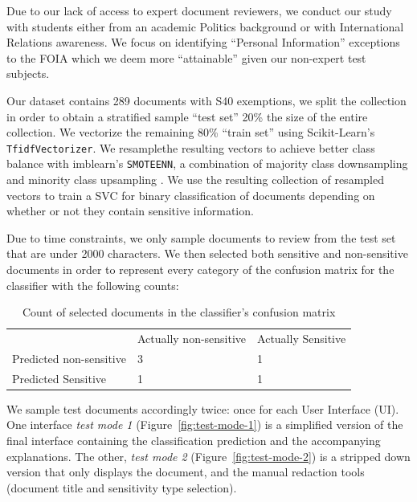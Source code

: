 \documentclass[\version]{l4proj}
\begin{document}
Due to our lack of access to expert document reviewers, we conduct our study with students either from an academic Politics background or with International Relations awareness.
We focus on identifying ``Personal Information'' exceptions to the FOIA which we deem more ``attainable'' given our non-expert test subjects.

Our dataset contains 289 documents with S40 exemptions, we split the collection in order to obtain a stratified sample ``test set'' 20\% the size of the entire collection.
We vectorize the remaining 80\% ``train set'' using Scikit-Learn's \verb|TfidfVectorizer|.
We resamplethe resulting vectors to achieve better class balance with imblearn's \verb|SMOTEENN|, a combination of majority class downsampling and minority class upsampling \autocite{lemaitreImbalancedlearnPythonToolbox2017}.
We use the resulting collection of resampled vectors to train a SVC for binary classification of documents depending on whether or not they contain sensitive information.

Due to time constraints, we only sample documents to review from the test set that are under 2000 characters.
We then selected both sensitive and non-sensitive documents in order to represent every category of the confusion matrix for the classifier with the following counts:

\begin{table}[H]
    \begin{tabular}{l ll}
                                & Actually non-sensitive & Actually Sensitive \\
        Predicted non-sensitive & 3                      & 1                  \\
        Predicted Sensitive     & 1                      & 1
    \end{tabular}
    \caption{Count of selected documents in the classifier's confusion matrix}\label{tab:confusion-matrix-selection}
\end{table}

We sample test documents accordingly twice: once for each User Interface (UI).
One interface \textit{test mode 1} (Figure~\ref{fig:test-mode-1}) is a simplified version of the final interface containing the classification prediction and the accompanying explanations.
The other, \textit{test mode 2} (Figure~\ref{fig:test-mode-2}) is a stripped down version that only displays the document, and the manual redaction tools (document title and sensitivity type selection).
\end{document}
